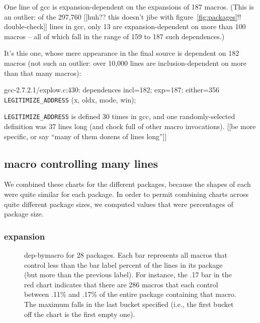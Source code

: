\documentclass[10pt]{article}
\begin{document}
      One line of gcc is expansion-dependent on the expansions of 187
      macros.  (This is an outlier: of the 297,760 [[huh?? this doesn't
      jibe with figure~\ref{fig:packages}!!  double-check]] lines in gcc,
      only 13 are expansion-dependent on more than 100 macros -- all of
      which fall in the range of 159 to 187 such dependences.)

        It's this one, whose mere appearance in the final source is
        dependent on 182 macros (not such an outlier: over 10,000 lines are
        inclusion-dependent on more than that many macros):

        gcc-2.7.2.1/explow.c:430: dependences incl=182; exp=187; either=356
              \verb|LEGITIMIZE_ADDRESS| (x, oldx, mode, win);

        \verb|LEGITIMIZE_ADDRESS| is defined 30 times in gcc, and one randomly-selected
        definition was 37 lines long (and chock full of other macro invocations).
        [[be more specific, or say ``many of them dozens of lines long'']]

\subsection{macro controlling many lines}

    We combined these charts for the different packages, because the shapes
      of each were quite similar for each package.  In order to permit
      combining charts across quite different package sizes, we computed
      values that were percentages of package size.

   \subsubsection{expansion}

\begin{figure}
\centerline{}
\bigskip
\centerline{}
\caption{dep-bymacro for 28 packages.
  Each bar represents all macros that control less than the bar label
  percent of the lines in its package (but more than the previous label).
  For instance, the .17 bar in the red chart indicates that there are 286
  macros that each control between .11\% and .17\% of the entire package
  containing that macro.  The maximum falls in the last bucket specified
  (i.e., the first bucket off the chart is the first empty one).}
\label{fig:dep-bymacro}
\end{figure}
\end{document}
